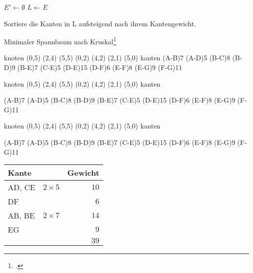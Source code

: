\documentclass{lehramt-informatik-haupt}
\begin{document}
\begin{algorithm}[H]

$E'\leftarrow \emptyset $\;
$L\leftarrow E$\;

Sortiere die Kanten in L aufsteigend nach ihrem Kantengewicht.\;

\caption{Minimaler Spannbaum nach Kruskal\footcite{wiki:kruskal}}
\end{algorithm}

\graph knoten {
  (0,5)
  (2,4)
  (5,5)
  (0,2)
  (4,2)
  (2,1)
  (5,0)
} kanten {
  \kante(A-B){7}
  \kante(A-D){5}
  \kante(B-C){8}
  \kante(B-D){9}
  \kante(B-E){7}
  \kante(C-E){5}
  \kante(D-E){15}
  \kante(D-F){6}
  \kante(E-F){8}
  \kante(E-G){9}
  \kante(F-G){11}
}

\def\TmpGraph#1{
  \graph knoten {
    \knoten{A}(0,5)
    \knoten{B}(2,4)
    \knoten{C}(5,5)
    \knoten{D}(0,2)
    \knoten{E}(4,2)
    (2,1)
    (5,0)
  } kanten {
    #1
  }
}

\TmpGraph{
  \kante(A-B){7}
  \kante(A-D){5}
  \kante(B-C){8}
  \kante(B-D){9}
  \kante(B-E){7}
  \kante(C-E){5}
  \kante(D-E){15}
  \kante(D-F){6}
  \kante(E-F){8}
  \kante(E-G){9}
  \kante(F-G){11}
}

\begin{minipage}{7cm}
\TmpGraph{
  \KANTE(A-B){7}
  \KANTE(A-D){5}
  \kante(B-C){8}
  \kante(B-D){9}
  \KANTE(B-E){7}
  \KANTE(C-E){5}
  \kante(D-E){15}
  \KANTE(D-F){6}
  \kante(E-F){8}
  \KANTE(E-G){9}
  \kante(F-G){11}
}
\end{minipage}
\begin{minipage}{4cm}
\begin{center}
\begin{tabular}{|l|l|r|}
\hline
Kante & & Gewicht\\\hline\hline
AD, CE & $2 \times 5$ & $10$\\
DF     &              & $6$\\
AB, BE & $2 \times 7$ & $14$\\
EG     &              & $9$\\\hline
       &              & $39$\\\hline
\end{tabular}
\end{center}
\end{minipage}
\end{document}
